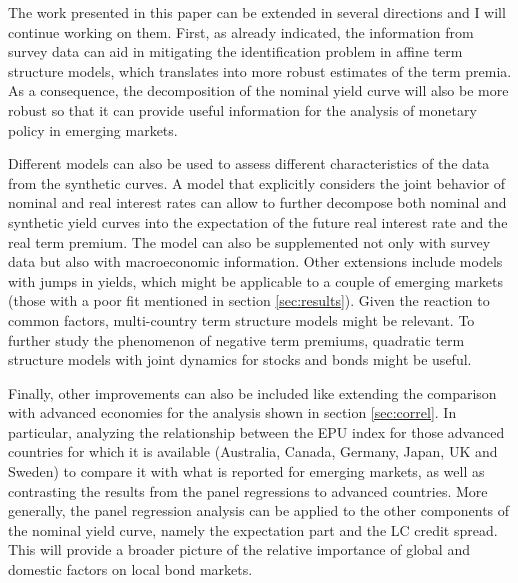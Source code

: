 {The work presented in this paper can be extended in several directions and I will continue working on them. First, as already indicated, the information from survey data can aid in mitigating the identification problem in affine term structure models, which translates into more robust estimates of the term premia. As a consequence, the decomposition of the nominal yield curve will also be more robust so that it can provide useful information for the analysis of monetary policy in emerging markets.

Different models can also be used to assess different characteristics of the data from the synthetic curves. A model that explicitly considers the joint behavior of nominal and real interest rates can allow to further decompose both nominal and synthetic yield curves into the expectation of the future real interest rate and the real term premium. The model can also be supplemented not only with survey data but also with macroeconomic information. Other extensions include models with jumps in yields, which might be applicable to a couple of emerging markets (those with a poor fit mentioned in section \ref{sec:results}). Given the reaction to common factors, multi-country term structure models might be relevant. To further study the phenomenon of negative term premiums, quadratic term structure models with joint dynamics for stocks and bonds might be useful.

Finally, other improvements can also be included like extending the comparison with advanced economies for the analysis shown in section \ref{sec:correl}. In particular, analyzing the relationship between the EPU index for those advanced countries for which it is available (Australia, Canada, Germany, Japan, UK and Sweden) to compare it with what is reported for emerging markets, as well as contrasting the results from the panel regressions to advanced countries. More generally, the panel regression analysis can be applied to the other components of the nominal yield curve, namely the expectation part and the LC credit spread. This will provide a broader picture of the relative importance of global and domestic factors on local bond markets.

}{}	%



